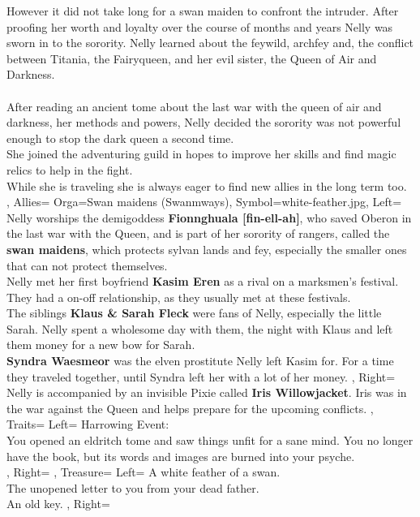 \documentclass[10pt,a4paper]{scrbook}
\begin{document}
{{			However it did not take long for a swan maiden to confront the intruder.
			After proofing her worth and loyalty over the course of months and years Nelly was sworn in to the sorority.
			Nelly learned about the feywild, archfey and, the conflict between Titania, the Fairyqueen, and her evil sister, the Queen of Air and Darkness.\\
			\\
			After reading an ancient tome about the last war with the queen of air and darkness, her methods and powers, Nelly decided the sorority was not powerful enough to stop the dark queen a second time.\\
			She joined the adventuring guild in hopes to improve her skills and find magic relics to help in the fight.\\
			While she is traveling she is always eager to find new allies in the long term too.\\
		},
		Allies={
			Orga=Swan maidens (Swanmways),
			Symbol=white-feather.jpg,
			Left={
				Nelly worships the demigoddess \textbf{Fionnghuala [fin-ell-ah]}, who saved Oberon in the last war with the Queen, and is part of her sorority of rangers, called the \textbf{swan maidens}, which protects sylvan lands and fey, especially the smaller ones that can not protect themselves.\\
				Nelly met her first boyfriend \textbf{Kasim Eren} as a rival on a marksmen's festival. They had a on-off relationship, as they usually met at these festivals.\\
				The siblings \textbf{Klaus \& Sarah Fleck} were fans of Nelly, especially the little Sarah. Nelly spent a wholesome day with them, the night with Klaus and left them money for a new bow for Sarah.\\
				\textbf{Syndra Waesmeor} was the elven prostitute Nelly left Kasim for. For a time they traveled together, until Syndra left her with a lot of her money.
			},
			Right={
				Nelly is accompanied by an invisible Pixie called \textbf{Iris Willowjacket}.
				Iris was in the war against the Queen and helps prepare for the upcoming conflicts.
			}
		},
		Traits={
			Left={
				Harrowing Event:\\
				You opened an eldritch tome and saw things unfit for a sane mind. You no longer have the book, but its words and images are burned into your psyche.\\
			},
			Right={
			}
		},
		Treasure={
			Left={
				A white feather of a swan.\\
				The unopened letter to you from your dead father.\\
				An old key.
			},
			Right={
			}
		}
	}
\end{document}

